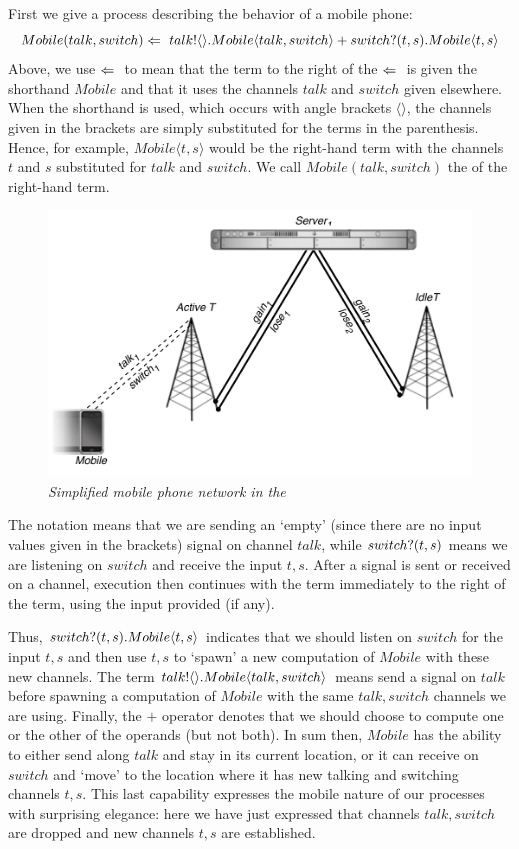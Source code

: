 	First we give a process describing the behavior of a mobile phone:
	\[
		Mobile(talk, switch) \Leftarrow\  {talk}!\langle{}\rangle. Mobile\langle talk,switch\rangle + {switch}?({t,s}). Mobile\langle t,s\rangle
	\]
	Above, we use $\Leftarrow\ $ to mean that the term to the right of the $\Leftarrow\ $ is given the shorthand $Mobile$ and that it uses the channels $talk$ and $switch$ given elsewhere.  
When the shorthand is used, which occurs with angle brackets $\langle\rangle$, the channels given in the brackets are simply substituted for the terms in the parenthesis.  
Hence, for example, $Mobile\langle t,s\rangle$ would be the right-hand term with the channels $t$ and $s$ substituted for $talk$ and $switch$. 
We call $Mobile(talk,switch)$ the  of the right-hand term.
	\begin{figure}[H]
	\centering
	\includegraphics[scale=0.7]{figures/cell_network_pi.pdf} %
	\caption{\emph{Simplified mobile phone network in the \picalc}}
	\label{fig_cell_network_pi}
	\end{figure}
	The notation  means that we are sending an `empty' (since there are no input values given in the brackets) signal on channel $talk$, while ${switch}?({t,s})$ means we are listening on $switch$ and receive the input $t,s$.  
After a signal is sent or received on a channel, execution then continues with the term immediately to the right of the term, using the input provided (if any).  

	
	Thus, ${switch}?({t,s}). Mobile\langle t,s\rangle$ indicates that we should listen on $switch$ for the input $t,s$ and then use $t,s$ to `spawn' a new computation of $Mobile$ with these new channels. 
	The term ${talk}!\langle{}\rangle. Mobile\langle talk,switch\rangle$ means send a signal on $talk$ before spawning a computation of $Mobile$ with the same $talk,switch$ channels we are using.  
Finally, the $+$ operator denotes that we should choose to compute one or the other of the operands (but not both).  
In sum then, $Mobile$ has the ability to either send along $talk$ and stay in its current location, or it can receive on $switch$ and `move' to the location where it has new talking and switching channels $t,s$.  
This last capability expresses the mobile nature of our processes with surprising elegance: here we have just expressed that channels $talk,switch$ are dropped and new channels $t,s$ are established.
	
